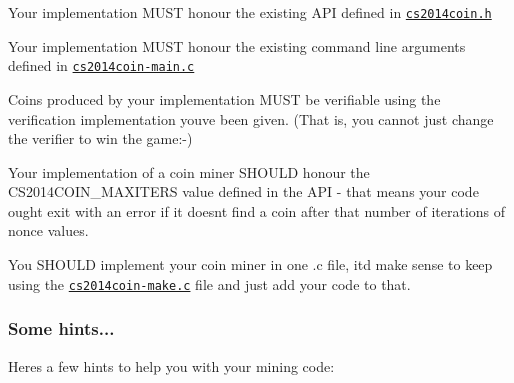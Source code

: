 \begin{DoxyItemize}
\item Your implementation M\+U\+ST honour the existing A\+PI defined in \href{./cs2014coin.h}{\tt cs2014coin.\+h}
\item Your implementation M\+U\+ST honour the existing command line arguments defined in \href{./cs2014coin-main.c}{\tt cs2014coin-\/main.\+c}
\item Coins produced by your implementation M\+U\+ST be verifiable using the verification implementation you\textquotesingle{}ve been given. (That is, you cannot just change the verifier to win the game\+:-\/)
\item Your implementation of a coin miner S\+H\+O\+U\+LD honour the C\+S2014\+C\+O\+I\+N\+\_\+\+M\+A\+X\+I\+T\+E\+RS value defined in the A\+PI -\/ that means your code ought exit with an error if it doesn\textquotesingle{}t find a coin after that number of iterations of nonce values.
\item You S\+H\+O\+U\+LD implement your coin miner in one .c file, it\textquotesingle{}d make sense to keep using the \href{./cs2014coin-make.c}{\tt cs2014coin-\/make.\+c} file and just add your code to that.
\end{DoxyItemize}

\subsubsection*{Some hints...}

Here\textquotesingle{}s a few hints to help you with your mining code\+:


